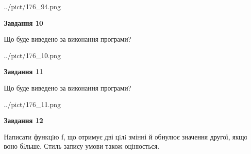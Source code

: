 \documentclass[12pt, ukrainian]{article}
\begin{document}
{\begin {large}
\begin{center}
	{../pict/176_94.png}
\end{center}
\newpage

{\begin {center}\textbf{Завдання 10}\end {center}}

Що буде виведено за виконання програми?\par
\begin{center}
	{../pict/176_10.png}
\end{center}
\newpage

{\begin {center}\textbf{Завдання 11}\end {center}}

Що буде виведено за виконання програми?\par
\begin{center}
	{../pict/176_11.png}
\end{center}
\newpage

{\begin {center}\textbf{Завдання 12}\end {center}}


Написати функцiю f, що отримує дві цiлi змінні й обнулює значення другої, якщо воно бiльше. Стиль запису умови також оцінюється.\par
\newpage

\end {large}}
\end{document}
